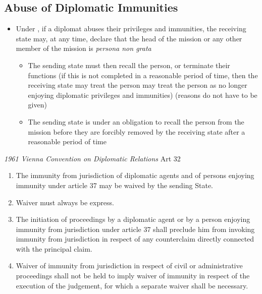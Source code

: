 \subsection{Abuse of Diplomatic Immunities}
\begin{itemize}
    \item Under , if a diplomat abuses their privileges and immunities, the receiving state may, at any time, declare that the head of the mission or any other member of the mission is \textit{persona non grata}
    \begin{itemize}
        \item The sending state must then recall the person, or terminate their functions (if this is not completed in a reasonable period of time, then the receiving state may treat the person may treat the person as no longer enjoying diplomatic privileges and immunities) (reasons do not have to be given)
        \item The sending state is under an obligation to recall the person from the mission before they are forcibly removed by the receiving state after a reasonable period of time
    \end{itemize}
\end{itemize}

\begin{conventiondetails}{\textit{1961 Vienna Convention on Diplomatic Relations} Art 32}
    \flushleft
    \begin{enumerate}
        \item The immunity from jurisdiction of diplomatic agents and of persons enjoying immunity under article 37 may be waived by the sending State.
        \item Waiver must always be express.
        \item The initiation of proceedings by a diplomatic agent or by a person enjoying immunity from jurisdiction under article 37 shall preclude him from invoking immunity from jurisdiction in respect of any counterclaim directly connected with the principal claim.
        \item Waiver of immunity from jurisdiction in respect of civil or administrative proceedings shall not be held to imply waiver of immunity in respect of the execution of the judgement, for which a separate waiver shall be necessary.
    \end{enumerate}
\end{conventiondetails}

